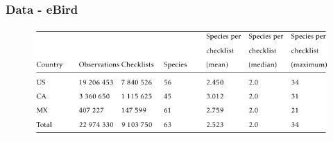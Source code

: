 \documentclass[10pt]{beamer}
\begin{document}
\begin{frame}
  \frametitle{Data - eBird}
  \begin{figure}
    \centering
    \hspace*{-0cm}\includegraphics[scale=0.4]{fig/ebird_table.png}
  \end{figure}
\end{frame}
\end{document}
